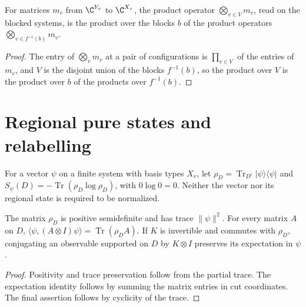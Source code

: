 \begin{theorem}
    \label{thm:sites_block_prod}
    \leanok
    For matrices $m_v$ from $\C^{Y_v}$ to $\C^{X_v}$, the product operator
    $\bigotimes_{v\in V}m_v$, read on the blocked systems, is the product over the blocks $b$
    of the product operators $\bigotimes_{v\in f^{-1}(b)}m_v$.
\end{theorem}
\begin{proof}\leanok
    The entry of $\bigotimes_vm_v$ at a pair of configurations is $\prod_{v\in V}$ of the
    entries of $m_v$, and $V$ is the disjoint union of the blocks $f^{-1}(b)$, so the product
    over $V$ is the product over $b$ of the products over $f^{-1}(b)$.
\end{proof}

\section{Regional pure states and relabelling}

\begin{definition}
    \label{def:sites-regional-state}
    \leanok
    For a vector $\psi$ on a finite system with basis types $X_v$, let
    $\rho_D=\operatorname{Tr}_{D^c}|\psi\rangle\langle\psi|$ and
    $S_\psi(D)=-\operatorname{Tr}(\rho_D\log\rho_D)$, with $0\log0=0$.
    Neither the vector nor its regional state is required to be normalized.
\end{definition}

\begin{lemma}
    \label{lem:sites-regional-expectations}
    \leanok
    The matrix $\rho_D$ is positive semidefinite and has trace $\|\psi\|^2$.
    For every matrix $A$ on $D$,
    $\langle\psi,(A\otimes I)\psi\rangle=\operatorname{Tr}(\rho_D A)$.
    If $K$ is invertible and commutes with $\rho_D$, conjugating an observable
    supported on $D$ by $K\otimes I$ preserves its expectation in $\psi$.
\end{lemma}
\begin{proof}
    \leanok
    Positivity and trace preservation follow from the partial trace.
    The expectation identity follows by summing the matrix entries in cut
    coordinates. The final assertion follows by cyclicity of the trace.
\end{proof}


